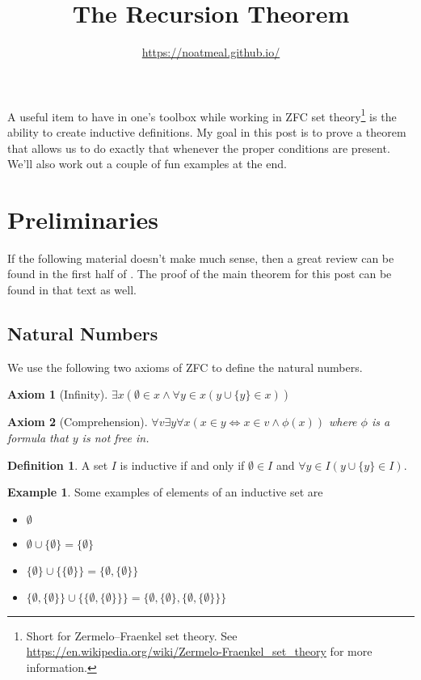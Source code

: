 \documentclass{article}
\title{The Recursion Theorem}
\author{\url{https://noatmeal.github.io/}}
\date{}
\theoremstyle{definition}
\newtheorem{definition}{Definition}[section]
\theoremstyle{definition}
\newtheorem{example}{Example}[section]
\theoremstyle{plain}
\theoremstyle{remark}
\theoremstyle{plain}
\theoremstyle{remark}
\theoremstyle{plain}
\theoremstyle{plain}
\newtheorem{axiom}{Axiom}[section]
\theoremstyle{plain}
\begin{document}
\maketitle

A useful item to have in one's toolbox while working in ZFC set 
theory\footnote{Short for Zermelo–Fraenkel set theory. See 
\url{https://en.wikipedia.org/wiki/Zermelo-Fraenkel_set_theory} for more 
information.} is the ability to create inductive definitions. My goal in this 
post is to prove a theorem that allows us to do exactly that whenever the 
proper conditions are present. We'll also work out a couple of fun examples at 
the end.

\section{Preliminaries}

If the following material doesn't make much sense, then a great review 
can be found in the first half of \cite{naiiveSet}. The proof of the main 
theorem for this post can be found in that text as well.

\subsection{Natural Numbers}

We use the following two axioms of ZFC to define the natural numbers.

\begin{axiom}[Infinity]
  \( \exists x ( \emptyset \in x \land \forall y \in x (y \cup \{y\} \in x))\)
  \label{axiom:infinity}
\end{axiom}

\begin{axiom}[Comprehension]
  \( 
    \forall v \exists y \forall x 
    (x \in y \Leftrightarrow x \in v \land \phi(x)) 
  \) 
  where 
  \( \phi \) is a formula that \( y \) is not free in.
  \label{axiom:comprehension}
\end{axiom}

\begin{definition}
  A set \( I \) is inductive if and only if \( \emptyset \in I \) and 
  \( \forall y \in I (y \cup \{y\} \in I )\).
\end{definition}

\begin{example}
  Some examples of elements of an inductive set are 
  \begin{itemize}
    \item \( \emptyset \)
    \item \( \emptyset \cup \{\emptyset\} = \{\emptyset\}\)
    \item \( 
            \{\emptyset\} \cup \{\{\emptyset\}\} 
            = \{\emptyset, \{\emptyset\}\}
          \)
    \item \(
            \{\emptyset, \{\emptyset\}\} \cup \{ \{\emptyset, \{\emptyset\}\} \} 
            = 
            \{ \emptyset, \{\emptyset\}, \{\emptyset, \{ \emptyset \} \} \} 
          \)
  \end{itemize}
  \label{example:inductive_set}
\end{example}
\end{document}
